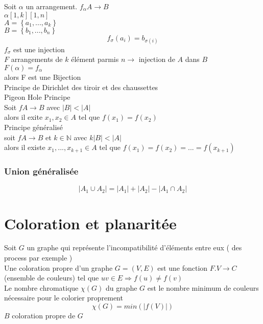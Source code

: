 \documentclass{report}
\newcommand{\N}{\mathbb{N}}
\begin{document}
Soit $\alpha$ un arrangement. $f_{\alpha} A \rightarrow B$\\
$\alpha \left[1,k\right]\left[1,n\right]$\\
$A=\left\{a_1,...,a_k\right\}$\\
$B=\left\{b_1,...,b_n\right\}$\\
$$f_{\sigma}\left(a_i\right)=b_{\sigma\left(i\right)}$$
$f_{\sigma}$ est une injection\\
$F$ arrangements de $k$ élément parmis $n \rightarrow$ injection de $A$ dans $B$\\
$F(\alpha) = f_{\alpha}$\\
alors F est une Bijection\\
Principe de Dirichlet des tiroir et des chaussettes\\
Pigeon Hole Principe \\
Soit $f A \rightarrow B$ avec $\left|B\right|<\left|A\right|$\\
alors il exite $x_1,x_2 \in A$ tel que $f(x_1)=f(x_2)$\\
Principe généralisé\\
soit $f A \rightarrow B$ et $k \in \N$ avec $k\left|B\right|<\left|A\right|$\\
alors il existe $x_1,...,x_{k+1} \in A$ tel que $f(x_1)=f(x_2)=...=f(x_{k+1})$\\

\subsubsection{Union généralisée}
$$\left|A_1 \cup A_2\right|=\left|A_1\right|+\left|A_2\right|-\left|A_1\cap A_2\right|$$

\section{Coloration et planaritée}
Soit $G$ un graphe qui représente l'incompatibilité d'éléments entre eux ( des process par exemple )\\

Une coloration propre d'un graphe $G=(V,E)$ est une fonction $F.V\rightarrow C$ (ensemble de couleurs) tel que $uv \in E \Rightarrow f(u) \neq f(v)$\\

Le nombre chromatique $\chi(G)$ du graphe $G$ est le nombre minimum de couleurs nécessaire pour le colorier proprement\\

$$\chi(G)=min\left(\left|f(V)\right|\right)$$
$B$ coloration propre de $G$\\
\end{document}
